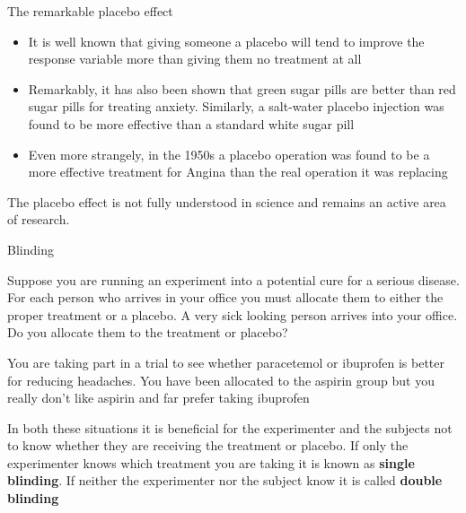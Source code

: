 \documentclass[12pt,xcolor=dvipsnames,handout,mathserif,aspectratio=169]{beamer}
\newcommand{\bbl}[1]{{\color{NavyBlue} \textbf{#1}}}
\newcommand{\bgr}[1]{{\color{PineGreen} \textbf{#1}}}
\begin{document}
\begin{frame}{The remarkable placebo effect }

\begin{itemize}
\item It is well known that giving someone a placebo will tend to improve the response variable more than giving them no treatment at all
\pause
\item Remarkably, it has also been shown that green sugar pills are better than red sugar pills for treating anxiety. Similarly, a salt-water placebo injection was found to be more effective than a standard white sugar pill
\pause
\item Even more strangely, in the 1950s a placebo operation was found to be a more effective treatment for Angina than the real operation it was replacing
\end{itemize}
\pause
The placebo effect is not fully understood in science and remains an active area of research. %
\end{frame}

\begin{frame}{Blinding }

\begin{block}{}
Suppose you are running an experiment into a potential cure for a serious disease. For each person who arrives in your office you must allocate them to either the proper treatment or a placebo. A very sick looking person arrives into your office. Do you allocate them to the treatment or placebo?
\end{block}
\pause
\begin{block}{}
You are taking part in a trial to see whether paracetemol or ibuprofen is better for reducing headaches. You have been allocated to the aspirin group but you really don't like aspirin and far prefer taking ibuprofen
\end{block}
\pause
In both these situations it is beneficial for the experimenter and the subjects not to know whether they are receiving the treatment or placebo. If only the experimenter knows which treatment you are taking it is known as \bbl{single blinding}. If neither the experimenter nor the subject know it is called \bgr{double blinding}

\end{frame}
\end{document}
